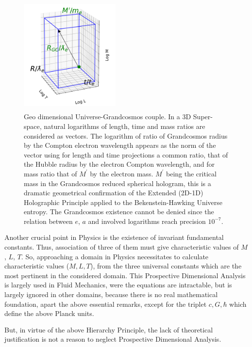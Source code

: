 \documentclass[twoside,draft]{article}
\begin{document}
\begin{sloppypar}
{\begin{figure}[h]
\centering
\includegraphics[width=5cm,height=6cm]{./figures/triaxis.png}
\caption{Geo dimensional Universe-Grandcosmos couple. In a 3D Super-space, natural logarithms of length, time and mass ratios are considered as vectors. The logarithm of ratio of Grandcosmos radius by the Compton electron wavelength appears as the norm of the vector using for length and time projections a common ratio, that of the Hubble radius by the electron Compton wavelength, and for mass ratio that of $M^{\prime}$ by the electron mass. $M^{\prime}$ being the critical mass in the Grandcosmos reduced spherical hologram, this is a dramatic geometrical confirmation of the Extended (2D-1D) Holographic Principle applied to the Bekenstein-Hawking Universe entropy. The Grandcosmos existence cannot be denied since the relation between $e$, $a$ and involved logarithms reach precision $10^{-7}$.} 
\end{figure}

Another crucial point in Physics is the existence of invariant fundamental constants. Thus,
association of three of them must give characteristic values of $M$, $L$, $T$. So, approaching a domain in
Physics necessitates to calculate characteristic values ($M, L, T$), from the three universal constants
which are the most pertinent in the considered domain. This Prospective Dimensional Analysis is
largely used in Fluid Mechanics, were the equations are intractable, but is largely ignored in other
domains, because there is no real mathematical foundation, apart the above essential remarks, except for the triplet $c, G, \hbar$ which define the above Planck units. 

But, in virtue of the above Hierarchy Principle, the lack of theoretical justification is not a reason to
neglect Prospective Dimensional Analysis. 

}
\end{sloppypar}
\end{document}
